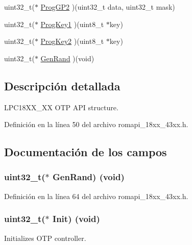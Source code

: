 \begin{DoxyCompactItemize}
\item 
uint32\+\_\+t($\ast$ \hyperlink{struct_o_t_p___a_p_i___t_a179192e9a2a7d6ce0ec78c84cac7aaff}{Prog\+G\+P2} )(uint32\+\_\+t data, uint32\+\_\+t mask)
\item 
uint32\+\_\+t($\ast$ \hyperlink{struct_o_t_p___a_p_i___t_a138d93e6b42e6ab0e39362c7e38f5df4}{Prog\+Key1} )(uint8\+\_\+t $\ast$key)
\item 
uint32\+\_\+t($\ast$ \hyperlink{struct_o_t_p___a_p_i___t_a043dc436fadf729d52f2db6570d9e8af}{Prog\+Key2} )(uint8\+\_\+t $\ast$key)
\item 
uint32\+\_\+t($\ast$ \hyperlink{struct_o_t_p___a_p_i___t_a0550aafd5d61c1953774c48ee329d480}{Gen\+Rand} )(void)
\end{DoxyCompactItemize}


\subsection{Descripción detallada}
L\+P\+C18\+X\+X\+\_\+XX O\+TP A\+PI structure. 

Definición en la línea 50 del archivo romapi\+\_\+18xx\+\_\+43xx.\+h.



\subsection{Documentación de los campos}
\subsubsection[{\texorpdfstring{Gen\+Rand}{GenRand}}]{\setlength{\rightskip}{0pt plus 5cm}uint32\+\_\+t($\ast$ Gen\+Rand) (void)}\hypertarget{struct_o_t_p___a_p_i___t_a0550aafd5d61c1953774c48ee329d480}{}\label{struct_o_t_p___a_p_i___t_a0550aafd5d61c1953774c48ee329d480}


Definición en la línea 64 del archivo romapi\+\_\+18xx\+\_\+43xx.\+h.

\subsubsection[{\texorpdfstring{Init}{Init}}]{\setlength{\rightskip}{0pt plus 5cm}uint32\+\_\+t($\ast$ Init) (void)}\hypertarget{struct_o_t_p___a_p_i___t_a8a4babfa1f2262f27ab56052d32844a9}{}\label{struct_o_t_p___a_p_i___t_a8a4babfa1f2262f27ab56052d32844a9}
Initializes O\+TP controller. 

